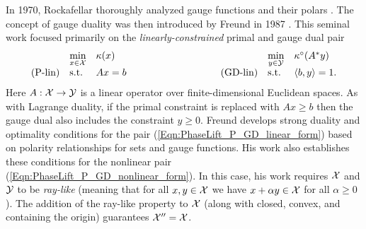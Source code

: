 In 1970, Rockafellar thoroughly analyzed gauge functions and their polars \cite[Part III]{rockafellar1970convex}.  
The concept of gauge duality was then introduced by Freund in 1987 \cite{DBLP:journals/mp/Freund87}.  
This seminal work focused primarily on the \textit{linearly-constrained} primal and gauge dual pair
\begin{equation} 			\label{Eqn:PhaseLift_P_GD_linear_form}
\begin{array}{lllllll}
	&	\min\limits_{\substack{x \in \caX}}
		&	\kappa(x)
			&
				&	\min\limits_{\substack{y \in \caY}}
					&	\kappa^\circ(A^*y)
						\\
\textnormal{(P-lin)}
	&	\st
		& 	Ax=b
			&	\hspace{3cm} 	\textnormal{(GD-lin)}
				&	\st
					&	\langle b, y \rangle = 1.
\end{array}
\end{equation}
Here $A : {\mathcal X} \rightarrow {\mathcal Y}$ is a linear operator over finite-dimensional Euclidean spaces. 
As with Lagrange duality, if the primal constraint is replaced with $Ax \geq b$ then the gauge dual also includes the constraint $y \geq 0$.  
Freund develops strong duality and optimality conditions for the pair (\ref{Eqn:PhaseLift_P_GD_linear_form}) based on polarity relationships for sets and gauge functions.  
His work also establishes these conditions for the nonlinear pair (\ref{Eqn:PhaseLift_P_GD_nonlinear_form}).  
In this case, his work requires ${\mathcal X}$ and ${\mathcal Y}$ to be \textit{ray-like} (meaning that for all $x, y \in {\mathcal X}$ we have $x + \alpha y \in {\mathcal X}$ for all $\alpha \geq 0$).  
The addition of the ray-like property to ${\mathcal X}$ (along with closed, convex, and containing the origin) guarantees ${\mathcal X}'' = {\mathcal X}$.


